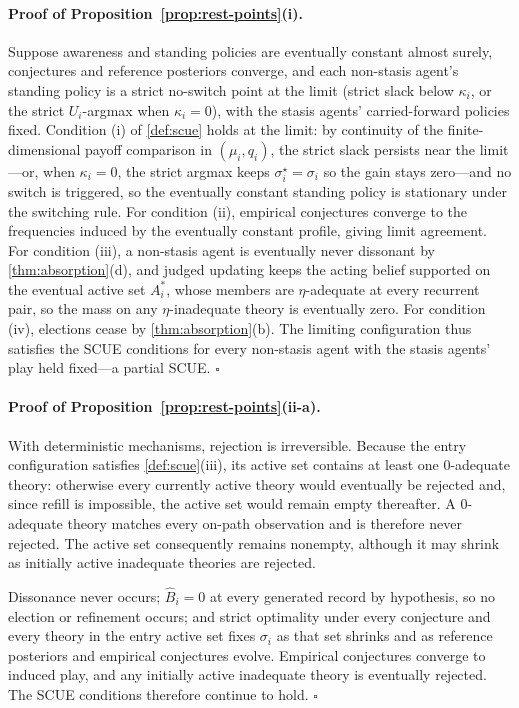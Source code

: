 \documentclass[11pt]{article}
\theoremstyle{definition}
\begin{document}
\paragraph{Proof of Proposition~\ref{prop:rest-points}(i).}
Suppose awareness and standing policies are eventually constant almost surely, conjectures and reference posteriors converge, and each non-stasis agent's standing policy is a strict no-switch point at the limit (strict slack below $\kappa_i$, or the strict $U_i$-argmax when $\kappa_i=0$), with the stasis agents' carried-forward policies fixed.
Condition (i) of \cref{def:scue} holds at the limit: by continuity of the finite-dimensional payoff comparison in $(\mu_i,q_i)$, the strict slack persists near the limit---or, when $\kappa_i=0$, the strict argmax keeps $\sigma_i^{\star}=\sigma_i$ so the gain stays zero---and no switch is triggered, so the eventually constant standing policy is stationary under the switching rule.
For condition (ii), empirical conjectures converge to the frequencies induced by the eventually constant profile, giving limit agreement.
For condition (iii), a non-stasis agent is eventually never dissonant by \cref{thm:absorption}(d), and judged updating keeps the acting belief supported on the eventual active set $A_i^{*}$, whose members are $\eta$-adequate at every recurrent pair, so the mass on any $\eta$-inadequate theory is eventually zero.
For condition (iv), elections cease by \cref{thm:absorption}(b).
The limiting configuration thus satisfies the SCUE conditions for every non-stasis agent with the stasis agents' play held fixed---a partial SCUE.
\hfill$\square$

\paragraph{Proof of Proposition~\ref{prop:rest-points}(ii-a).}
With deterministic mechanisms, rejection is irreversible.
Because the entry configuration satisfies \cref{def:scue}(iii), its active set contains at least one $0$-adequate theory: otherwise every currently active theory would eventually be rejected and, since refill is impossible, the active set would remain empty thereafter.
A $0$-adequate theory matches every on-path observation and is therefore never rejected.
The active set consequently remains nonempty, although it may shrink as initially active inadequate theories are rejected.

Dissonance never occurs; $\widehat B_i=0$ at every generated record by hypothesis, so no election or refinement occurs; and strict optimality under every conjecture and every theory in the entry active set fixes $\sigma_i$ as that set shrinks and as reference posteriors and empirical conjectures evolve.
Empirical conjectures converge to induced play, and any initially active inadequate theory is eventually rejected.
The SCUE conditions therefore continue to hold.
\hfill$\square$
\end{document}
